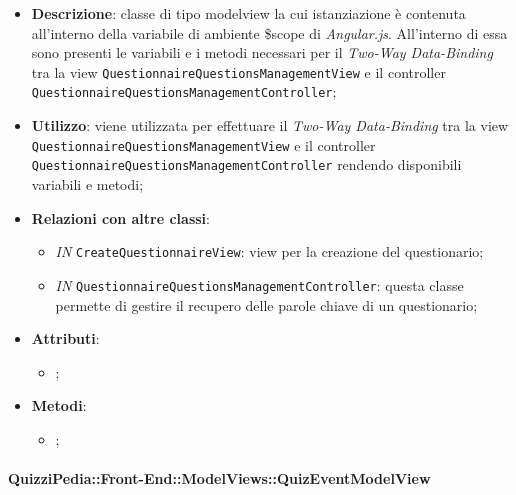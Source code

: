 					\begin{itemize}
						\item \textbf{Descrizione}: classe di tipo modelview la cui istanziazione è contenuta all'interno della variabile di ambiente \$scope di \textit{Angular.js}. All'interno di essa sono presenti le variabili e i metodi necessari per il \textit{Two-Way Data-Binding} tra la view \texttt{QuestionnaireQuestionsManagementView} e il controller \texttt{QuestionnaireQuestionsManagementController};
						\item \textbf{Utilizzo}: viene utilizzata per effettuare il \textit{Two-Way Data-Binding} tra la view \texttt{QuestionnaireQuestionsManagementView} e il controller \texttt{QuestionnaireQuestionsManagementController} rendendo disponibili variabili e metodi;
						\item \textbf{Relazioni con altre classi}: 
						\begin{itemize}
							\item \textit{IN} \texttt{CreateQuestionnaireView}: view per la creazione del questionario; 
							\item \textit{IN} \texttt{QuestionnaireQuestionsManagementController}: questa classe permette di gestire il recupero delle parole chiave di un questionario;
						\end{itemize}
						\item \textbf{Attributi}: 
						\begin{itemize}
							\item ;
						\end{itemize}
						\item \textbf{Metodi}: 
						\begin{itemize}
							\item ;
						\end{itemize}
					\end{itemize}
					
						
							\paragraph{QuizziPedia::Front-End::ModelViews::QuizEventModelView}
							
							\label{QuizziPedia::Front-End::ModelViews::QuizEventModelView}
							
